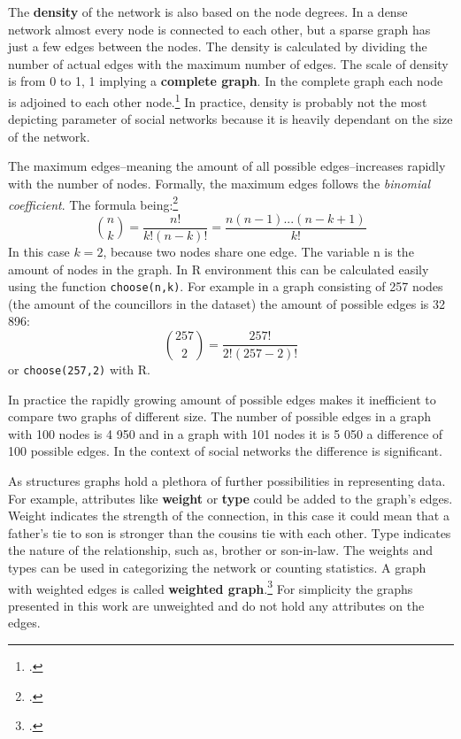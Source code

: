 The \textbf{density} of the network is also based on the node degrees. In a dense network almost every node is connected to each other, but a sparse graph has just a few edges between the nodes. The density is calculated by dividing the number of actual edges with the maximum number of edges. The scale of density is from 0 to 1, 1 implying a \textbf{complete graph}. In the complete graph each node is adjoined to each other node.\footcite[pp. 5-6.]{RajPM2018} In practice, density is probably not the most depicting parameter of social networks because it is heavily dependant on the size of the network. 

The maximum edges–meaning the amount of all possible edges–increases rapidly with the number of nodes. Formally, the maximum edges follows the \textit{binomial coefficient}. The formula being:\footcites[p. 16.]{laininen2002}[pp. 5-6.]{RajPM2018}
\begin{equation*}
\binom{n}{k} = \frac{n!}{k!(n-k)!} = \frac{n(n-1)...(n-k+1)}{k!}
\end{equation*}
In this case $k = 2$, because two nodes share one edge. The variable n is the amount of nodes in the graph. In R environment this can be calculated easily using the function \texttt{choose(n,k)}. For example in a graph consisting of 257 nodes (the amount of the councillors in the dataset) the amount of possible edges is 32 896:
\begin{equation*}
\binom{257}{2} = \frac{257!}{2!(257-2)!}
\end{equation*}
or \texttt{choose(257,2)} with R.

In practice the rapidly growing amount of possible edges makes it inefficient to compare two graphs of different size. The number of possible edges in a graph with 100 nodes is 4 950 and in a graph with 101 nodes it is 5 050 a difference of 100 possible edges. In the context of social networks the difference is significant.

As structures graphs hold a plethora of further possibilities in representing data. For example, attributes like \textbf{weight} or \textbf{type} could be added to the graph's edges. Weight indicates the strength of the connection, in this case it could mean that a father's tie to son is stronger than the cousins tie with each other. Type indicates the nature of the relationship, such as, brother or son-in-law. The weights and types can be used in categorizing the network or counting statistics. A graph with weighted edges is called \textbf{weighted graph}.\footcite[pp. 11-12.]{RajPM2018} For simplicity the graphs presented in this work are unweighted and do not hold any attributes on the edges. 

